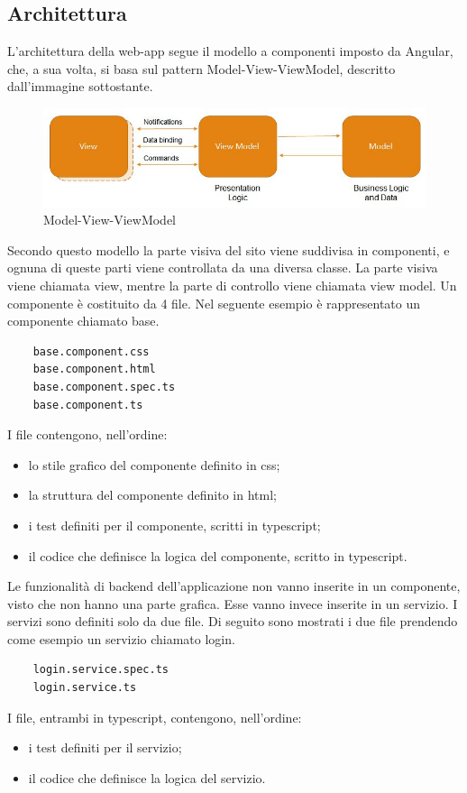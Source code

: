 \subsection{Architettura}
L'architettura della web-app segue il modello a componenti imposto da Angular, che, a sua volta, si basa sul pattern Model-View-ViewModel, descritto dall'immagine sottostante.
\begin{figure}[H]
	\centering
	\includegraphics[width=15cm]{res/images/mvvm.jpg}
	\caption{Model-View-ViewModel}
	\label{fig:Model-View-ViewModel}
\end{figure}
Secondo questo modello la parte visiva del sito viene suddivisa in componenti, e ognuna di queste parti viene controllata da una diversa classe.
La parte visiva viene chiamata view, mentre la parte di controllo viene chiamata view model.
Un componente è costituito da 4 file. Nel seguente esempio è rappresentato un componente chiamato base.
\begin{verbatim}
	base.component.css
	base.component.html
	base.component.spec.ts
	base.component.ts
\end{verbatim}
I file contengono, nell'ordine:
\begin{itemize}
	\item lo stile grafico del componente definito in css;
	\item la struttura del componente definito in html;
	\item i test definiti per il componente, scritti in typescript;
	\item il codice che definisce la logica del componente, scritto in typescript.
\end{itemize}

Le funzionalità di backend dell'applicazione non vanno inserite in un componente, visto che non hanno una parte grafica. Esse vanno invece inserite in un servizio. I servizi sono definiti solo da due file. Di seguito sono mostrati i due file prendendo come esempio un servizio chiamato login. 
\begin{verbatim}
	login.service.spec.ts
	login.service.ts
\end{verbatim}
I file, entrambi in typescript, contengono, nell'ordine:
\begin{itemize}
	\item i test definiti per il servizio;
	\item il codice che definisce la logica del servizio.
\end{itemize}

